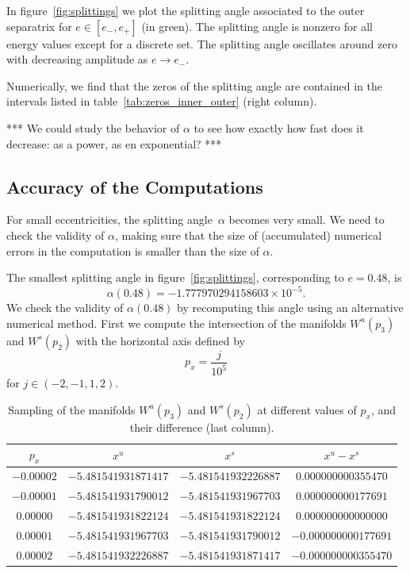 \documentclass[a4paper]{amsart}
\theoremstyle{remark}
\begin{document}
In figure~\ref{fig:splittings} we plot the splitting angle associated
to the outer separatrix for $e\in[e_-,e_+]$ (in green).
The splitting angle is nonzero for all energy values except for a
discrete set.  The splitting angle oscillates around zero with
decreasing amplitude as $e\to e_-$. 

Numerically, we find that the zeros of the splitting angle are
contained in the intervals listed in table~\ref{tab:zeros_inner_outer}
(right column).

*** We could study the behavior of $\alpha$ to see how exactly how fast
does it decrease: as a power, as en exponential? ***

\subsection{Accuracy of the Computations}
\label{sec:accuracy_computations}

For small eccentricities, the splitting angle~$\alpha$ becomes very
small.
We need to check the validity of $\alpha$, making sure that the size
of (accumulated) numerical errors in the computation is smaller than
the size of $\alpha$.

The smallest splitting angle in figure~\ref{fig:splittings},
corresponding to $e=0.48$, is 
\[ \alpha(0.48)= -1.777970294158603 \times 10^{-5}. \]
We check the validity of $\alpha(0.48)$ by recomputing this angle using 
an alternative numerical method.
First we compute the intersection of the manifolds $W^u(p_3)$ and
$W^s(p_2)$ with the horizontal axis defined by
\[ p_x = \frac{j}{10^{5}} \]
for $j\in (-2,-1,1,2)$. 

\begin{table}
\begin{tabular}{|c|c|c|c|}
\hline
$p_x$ & $x^u$ & $x^s$ & $x^u-x^s$ \\
\hline
$-0.00002$ & $-5.481541931871417$ & $-5.481541932226887$ &
$0.000000000355470$ \\
$-0.00001$ & $-5.481541931790012$ & $-5.481541931967703$ &
$0.000000000177691$ \\
$0.00000$ & $-5.481541931822124$ & $-5.481541931822124$ &
$0.000000000000000$ \\
$0.00001$ & $-5.481541931967703$ & $-5.481541931790012$ &
$-0.000000000177691$ \\
$0.00002$ & $-5.481541932226887$ & $-5.481541931871417$ &
$-0.000000000355470$\\
\hline
\end{tabular}
\caption{Sampling of the manifolds $W^u(p_3)$ and $W^s(p_2)$ at
different values of $p_x$, and their difference (last column).}
\label{tab:differentiation}
\end{table}
\end{document}
